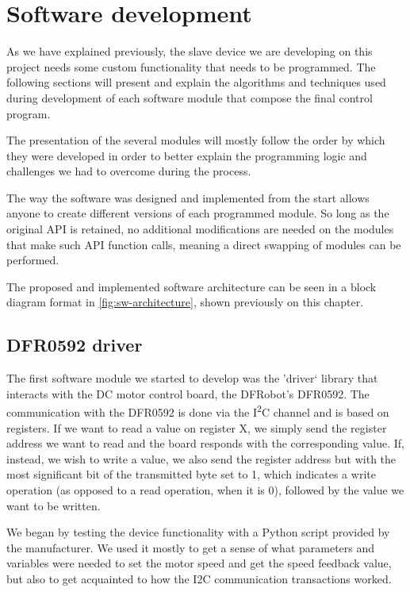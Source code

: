 \section{Software development} \label{sec:software-devel}
As we have explained previously, the slave device we are developing on this project needs some custom functionality that needs to be programmed.
The following sections will present and explain the algorithms and techniques used during development of each software module that compose the final control program.

The presentation of the several modules will mostly follow the order by which they were developed in order to better explain the programming logic and challenges we had to overcome during the process.

The way the software was designed and implemented from the start allows anyone to create different versions of each programmed module.
So long as the original API is retained, no additional modifications are needed on the modules that make such API function calls, meaning a direct swapping of modules can be performed.

The proposed and implemented software architecture can be seen in a block diagram format in \autoref{fig:sw-architecture}, shown previously on this chapter.

\subsection{DFR0592 driver}
The first software module we started to develop was the 'driver` library that interacts with the DC motor control board, the DFRobot's DFR0592.
The communication with the DFR0592 is done via the I\textsuperscript{2}C channel and is based on registers.
If we want to read a value on register X, we simply send the register address we want to read and the board responds with the corresponding value.
If, instead, we wish to write a value, we also send the register address but with the most significant bit of the transmitted byte set to 1, which indicates a write operation (as opposed to a read operation, when it is 0), followed by the value we want to be written.

We began by testing the device functionality with a Python \cite{sw:python} script provided by the manufacturer.
We used it mostly to get a sense of what parameters and variables were needed to set the motor speed and get the speed feedback value, but also to get acquainted to how the I2C communication transactions worked.

